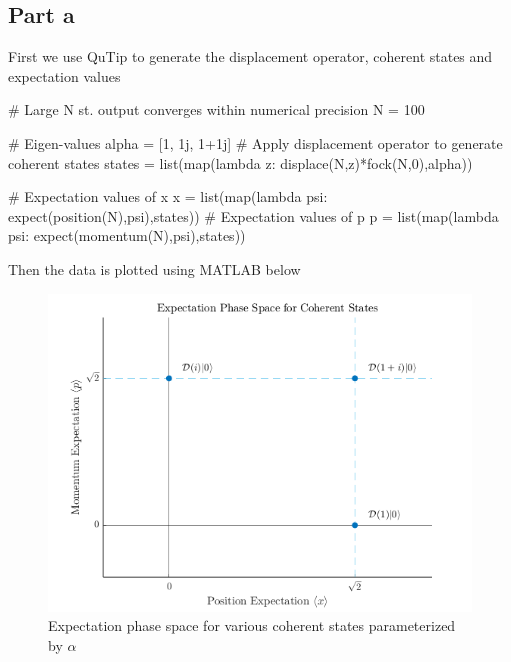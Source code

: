 \subsection*{Part a}
First we use QuTip to generate the displacement operator, coherent states and expectation values
\begin{python}
# Large N st. output converges within numerical precision
N = 100

# Eigen-values
alpha = [1, 1j, 1+1j]
# Apply displacement operator to generate coherent states
states = list(map(lambda z: displace(N,z)*fock(N,0),alpha))

# Expectation values of x
x = list(map(lambda psi: expect(position(N),psi),states))
# Expectation values of p
p = list(map(lambda psi: expect(momentum(N),psi),states))
\end{python}
Then the data is plotted using MATLAB below
\begin{figure}[h]
    \centering
    \includegraphics[width=1\linewidth]{Resources//245//Homework 5/245 Homework 5 Problem 2a.png}
    \caption{Expectation phase space for various coherent states parameterized by $\alpha$}
    \label{fig:2a}
\end{figure}

